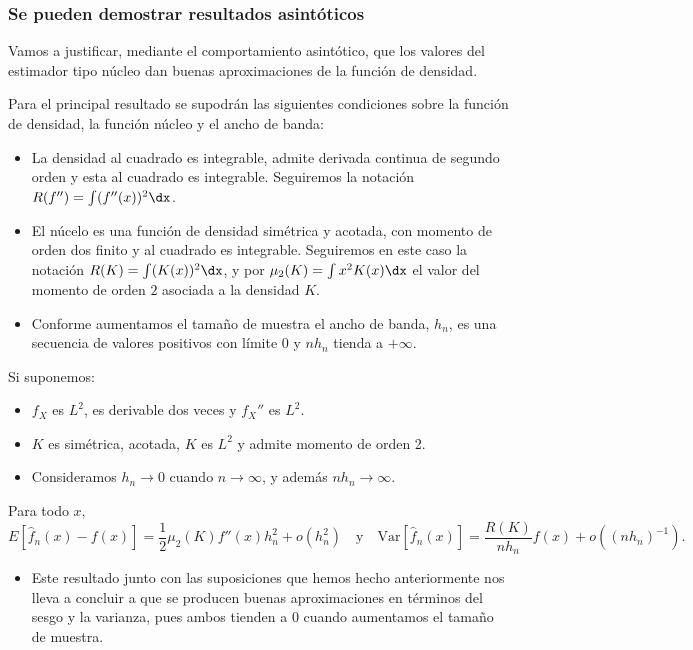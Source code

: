 \subsubsection{Se pueden demostrar resultados asintóticos}
\begin{tcolorbox}[colback=blue!5!white, colframe=blue!75!black, title=\textbf{Función núcleo}]
Vamos a justificar, mediante el comportamiento asintótico, que los valores del estimador tipo núcleo dan buenas aproximaciones de la función de densidad.

Para el principal resultado se supodrán las siguientes condiciones sobre la función de densidad, la función núcleo y el ancho de banda:
\begin{itemize}[label=\textbullet]
    \item La densidad al cuadrado es integrable, admite derivada continua de segundo orden y esta al cuadrado es integrable. Seguiremos la notación $R(f'')=\int (f''(x))^2\dx $.
    \item El núcelo es una función de densidad simétrica y acotada, con momento de orden dos finito y al cuadrado es integrable. Seguiremos en este caso la notación $R(K)=\int(K(x))^2\dx $, y por $\mu_2(K)=\int x^2K(x)\dx $ el valor del momento de orden $2$ asociada a la densidad  $K$.
    \item Conforme aumentamos el tamaño de muestra el ancho de banda, $h_n$, es una secuencia de valores positivos con límite $0$ y $nh_n$ tienda a  $+\infty$.
\end{itemize}
\end{tcolorbox}
Si suponemos:
\begin{itemize}[label=\textbullet]
    \item $f_X$ es  $L^2$, es derivable dos veces y $f_X''$ es  $L^2$.
    \item $K$ es simétrica, acotada, $K$ es $L^2$ y admite momento de orden 2.
    \item Consideramos $h_n\to 0$ cuando $n\to \infty$, y además $nh_n\to \infty$.
\end{itemize}
\begin{tcolorbox}[colback=blue!5!white, colframe=blue!75!black, title=\textbf{Resultado}]
Para todo $x,$  \[
E\left[ \hat{f}_n(x)-f(x) \right] =\dfrac{1}{2}\mu_2(K)f''(x)h_n^2+o(h_n^2)\quad\text{y}\quad \mathrm{Var}\left[ \hat{f}_n(x) \right] =\dfrac{R(K)}{nh_n}f(x)+o((nh_n)^{-1}).
\] 
\begin{itemize}[label=\textbullet]
    \item Este resultado junto con las suposiciones que hemos hecho anteriormente nos lleva a concluir a que se producen buenas aproximaciones en términos del sesgo y la varianza, pues ambos tienden a 0 cuando aumentamos el tamaño de muestra.
\end{itemize}
\end{tcolorbox}
